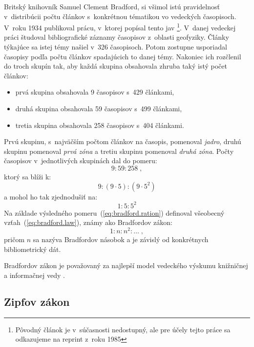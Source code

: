 Britský knihovník Samuel Clement Bradford, si všimol istú pravidelnosť
v~distribúcii počtu článkov s~konkrétnou tématikou vo vedeckých časopisoch.
V~roku 1934 publikoval prácu, v~ktorej popísal tento jav
\citep{Bradford1985}\footnote{Pôvodný článok je v~súčasnosti nedostupný, ale pre
  účely tejto práce sa odkazujeme na reprint z~roku 1985}.  V~danej vedeckej
práci študoval bibliografické záznamy časopisov z~oblasti geofyziky.  Články
týkajúce sa istej témy našiel v~326 časopisoch.  Potom zostupne usporiadal
časopisy podľa počtu článkov spadajúcich to danej témy.  Nakoniec ich rozčlenil
do troch skupín tak, aby každá skupina obsahovala zhruba taký istý počet
článkov:

\begin{itemize}
\item prvá skupina obsahovala 9 časopisov s~429 článkami,
\item druhá skupina obsahovala 59 časopisov s~499 článkami,
\item tretia skupina obsahovala 258 časopisov s~404 článkami.
\end{itemize}
Prvú skupinu, s~najväčším počtom článkov na časopis, pomenoval \emph{jadro},
druhú skupinu pomenoval \emph{prvá zóna} a tretiu skupinu pomenoval \emph{druhá
  zóna}.  Počty časopisov v~jednotlivých skupinách dal do pomeru:
\begin{equation*}
9 : 59 : 258 \;,
\end{equation*}
ktorý sa blíži k:
\begin{equation*}
9 : (9 \cdot 5) : (9 \cdot 5^2)
\end{equation*}
a mohol ho tak zjednodušiť na:
\begin{equation}
\label{eq:bradford.ration}
1 : 5 : 5^2
\end{equation}
Na základe výsledného pomeru~(\ref{eq:bradford.ration}) definoval všeobecný
vzťah~(\ref{eq:bradford.law}), známy ako Bradfordov zákon:
\begin{equation}
\label{eq:bradford.law}
1 : n : n^2 : \dotso \;,
\end{equation}
pričom $n$ sa nazýva Bradfordov násobok a je závislý od konkrétnych
bibliometrický dát.

Bradfordov zákon je považovaný za najlepší model vedeckého výskumu knižničnej a
informačnej vedy \citep[napr.][]{Nicolaisen2007}.


\subsection{Zipfov zákon}


